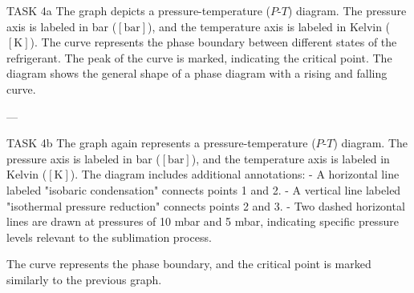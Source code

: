 TASK 4a  
The graph depicts a pressure-temperature (\(P\)-\(T\)) diagram. The pressure axis is labeled in bar (\([ \text{bar} ]\)), and the temperature axis is labeled in Kelvin (\([ \text{K} ]\)). The curve represents the phase boundary between different states of the refrigerant. The peak of the curve is marked, indicating the critical point. The diagram shows the general shape of a phase diagram with a rising and falling curve.

---

TASK 4b  
The graph again represents a pressure-temperature (\(P\)-\(T\)) diagram. The pressure axis is labeled in bar (\([ \text{bar} ]\)), and the temperature axis is labeled in Kelvin (\([ \text{K} ]\)). The diagram includes additional annotations:  
- A horizontal line labeled "isobaric condensation" connects points 1 and 2.  
- A vertical line labeled "isothermal pressure reduction" connects points 2 and 3.  
- Two dashed horizontal lines are drawn at pressures of 10 mbar and 5 mbar, indicating specific pressure levels relevant to the sublimation process.  

The curve represents the phase boundary, and the critical point is marked similarly to the previous graph.
